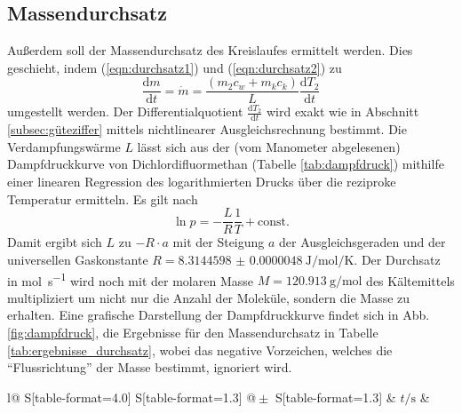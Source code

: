 \subsection{Massendurchsatz}
  Außerdem soll der Massendurchsatz des Kreislaufes ermittelt werden. Dies geschieht, indem (\ref{eqn:durchsatz1}) und (\ref{eqn:durchsatz2}) zu
  \begin{equation}
    \frac{\mathrm{d}m}{\mathrm{d}t} = \dot m = \frac{(m_{2} c_w + m_k c_k)}{L}\frac {\mathrm{d}T_{2}}{\mathrm{d}t}
  \end{equation}
  umgestellt werden. Der Differentialquotient $\frac {\mathrm{d}T_{2}}{\mathrm{d}t}$ wird exakt wie in Abschnitt \ref{subsec:güteziffer} mittels nichtlinearer Ausgleichsrechnung bestimmt. Die Verdampfungswärme $L$ lässt sich aus der (vom Manometer abgelesenen) Dampfdruckkurve von Dichlordifluormethan (Tabelle \ref{tab:dampfdruck}) mithilfe einer linearen Regression des logarithmierten Drucks über die reziproke Temperatur ermitteln. Es gilt nach \cite{anleitung203}
  \begin{equation}
    \ln p = -\frac{L}{R} \frac {1}{T} + \mathrm{const.}
  \end{equation}
  Damit ergibt sich $L$ zu $-R \cdot a$ mit der Steigung $a$ der Ausgleichsgeraden und der universellen Gaskonstante $R = \SI[separate-uncertainty=false]{8.3144598(48)}{\joule\per\mol\per\kelvin}$\cite{codata}. Der Durchsatz in \si{\mol\per\second} wird noch mit der molaren Masse $M = \SI{120.913}{\gram\per\mol}$\cite[267]{gase} des Kältemittels multipliziert um nicht nur die Anzahl der Moleküle, sondern die Masse zu erhalten. Eine grafische Darstellung der Dampfdruckkurve findet sich in Abb. \ref {fig:dampfdruck}, die Ergebnisse für den Massendurchsatz in Tabelle \ref{tab:ergebnisse_durchsatz}, wobei das negative Vorzeichen, welches die \enquote{Flussrichtung} der Masse bestimmt, ignoriert wird.

  \begin{table}[htbp]
    \centering
    \caption{Ermittelte Massendurchsätze.}
    \label{tab:ergebnisse_durchsatz}
    \begin{tabular}{
        l@{}
        S[table-format=4.0]
        S[table-format=1.3] @{${}\pm{}$} S[table-format=1.3]}
      \toprule
      & $t / \si{\second}$
      &  \\
      \midrule
      
      \bottomrule
    \end{tabular}
  \end{table}

